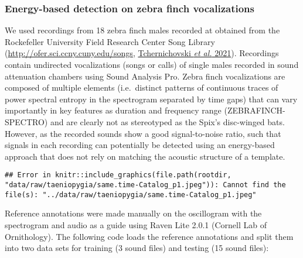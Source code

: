 \documentclass[
]{article}
\newenvironment{Shaded}{\begin{snugshade}}{\end{snugshade}}
\newcommand{\DecValTok}[1]{\textcolor[rgb]{0.00,0.00,0.81}{#1}}
\newcommand{\FunctionTok}[1]{\textcolor[rgb]{0.00,0.00,0.00}{#1}}
\newcommand{\NormalTok}[1]{#1}
\newcommand{\OtherTok}[1]{\textcolor[rgb]{0.56,0.35,0.01}{#1}}
\newcommand{\SpecialCharTok}[1]{\textcolor[rgb]{0.00,0.00,0.00}{#1}}
\newcommand{\StringTok}[1]{\textcolor[rgb]{0.31,0.60,0.02}{#1}}
\begin{document}
\hypertarget{energy-based-detection-on-zebra-finch-vocalizations}{%
\subsubsection{Energy-based detection on zebra finch
vocalizations}\label{energy-based-detection-on-zebra-finch-vocalizations}}

We used recordings from 18 zebra finch males recorded at obtained from
the Rockefeller University Field Research Center Song Library
(\url{http://ofer.sci.ccny.cuny.edu/songs},
\protect\hyperlink{ref-Tchernichovski2021}{Tchernichovski \emph{et al.}
2021}). Recordings contain undirected vocalizations (songs or calls) of
single males recorded in sound attenuation chambers using Sound Analysis
Pro. Zebra finch vocalizations are composed of multiple elements
(i.e.~distinct patterns of continuous traces of power spectral entropy
in the spectrogram separated by time gaps) that can vary importantly in
key features as duration and frequency range (ZEBRAFINCH-SPECTRO) and
are clearly not as stereotyped as the Spix's disc-winged bats. However,
as the recorded sounds show a good signal-to-noise ratio, such that
signals in each recording can potentially be detected using an
energy-based approach that does not rely on matching the acoustic
structure of a template.

\begin{verbatim}
## Error in knitr::include_graphics(file.path(rootdir, "data/raw/taeniopygia/same.time-Catalog_p1.jpeg")): Cannot find the file(s): "../data/raw/taeniopygia/same.time-Catalog_p1.jpeg"
\end{verbatim}

Reference annotations were made manually on the oscillogram with the
spectrogram and audio as a guide using Raven Lite 2.0.1 (Cornell Lab of
Ornithology). The following code loads the reference annotations and
split them into two data sets for training (3 sound files) and testing
(15 sound files):

\begin{Shaded}
\end{Shaded}
\end{document}
